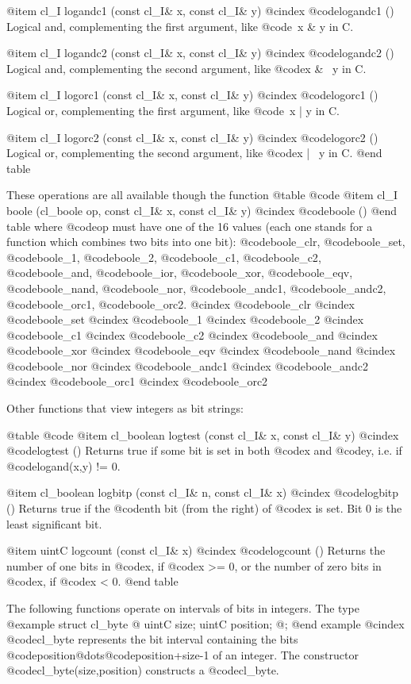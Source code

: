 @item cl_I logandc1 (const cl_I& x, const cl_I& y)
@cindex @code{logandc1 ()}
Logical and, complementing the first argument, like @code{~x & y} in C.

@item cl_I logandc2 (const cl_I& x, const cl_I& y)
@cindex @code{logandc2 ()}
Logical and, complementing the second argument, like @code{x & ~y} in C.

@item cl_I logorc1 (const cl_I& x, const cl_I& y)
@cindex @code{logorc1 ()}
Logical or, complementing the first argument, like @code{~x | y} in C.

@item cl_I logorc2 (const cl_I& x, const cl_I& y)
@cindex @code{logorc2 ()}
Logical or, complementing the second argument, like @code{x | ~y} in C.
@end table

These operations are all available though the function
@table @code
@item cl_I boole (cl_boole op, const cl_I& x, const cl_I& y)
@cindex @code{boole ()}
@end table
where @code{op} must have one of the 16 values (each one stands for a function
which combines two bits into one bit): @code{boole_clr}, @code{boole_set},
@code{boole_1}, @code{boole_2}, @code{boole_c1}, @code{boole_c2},
@code{boole_and}, @code{boole_ior}, @code{boole_xor}, @code{boole_eqv},
@code{boole_nand}, @code{boole_nor}, @code{boole_andc1}, @code{boole_andc2},
@code{boole_orc1}, @code{boole_orc2}.
@cindex @code{boole_clr}
@cindex @code{boole_set}
@cindex @code{boole_1}
@cindex @code{boole_2}
@cindex @code{boole_c1}
@cindex @code{boole_c2}
@cindex @code{boole_and}
@cindex @code{boole_xor}
@cindex @code{boole_eqv}
@cindex @code{boole_nand}
@cindex @code{boole_nor}
@cindex @code{boole_andc1}
@cindex @code{boole_andc2}
@cindex @code{boole_orc1}
@cindex @code{boole_orc2}


Other functions that view integers as bit strings:

@table @code
@item cl_boolean logtest (const cl_I& x, const cl_I& y)
@cindex @code{logtest ()}
Returns true if some bit is set in both @code{x} and @code{y}, i.e. if
@code{logand(x,y) != 0}.

@item cl_boolean logbitp (const cl_I& n, const cl_I& x)
@cindex @code{logbitp ()}
Returns true if the @code{n}th bit (from the right) of @code{x} is set.
Bit 0 is the least significant bit.

@item uintC logcount (const cl_I& x)
@cindex @code{logcount ()}
Returns the number of one bits in @code{x}, if @code{x} >= 0, or
the number of zero bits in @code{x}, if @code{x} < 0.
@end table

The following functions operate on intervals of bits in integers. 
The type
@example
struct cl_byte @{ uintC size; uintC position; @};
@end example
@cindex @code{cl_byte}
represents the bit interval containing the bits
@code{position}@dots{}@code{position+size-1} of an integer.
The constructor @code{cl_byte(size,position)} constructs a @code{cl_byte}.

